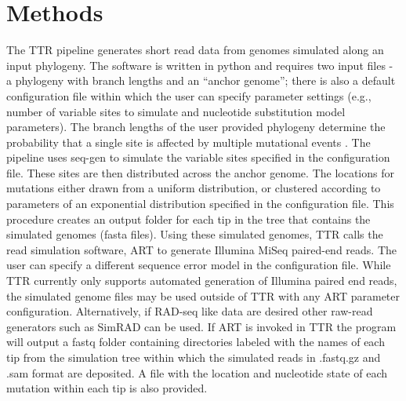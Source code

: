 
\section{Methods}
The TTR pipeline generates short read data from genomes simulated along an input phylogeny. 
The software is written in python and requires two input files - a phylogeny with branch lengths and an “anchor genome”; 
there is also a default configuration file within which the user can specify parameter settings (e.g., number of variable sites to simulate and nucleotide substitution model parameters). 
The branch lengths of the user provided phylogeny determine the probability that a single site is affected by multiple mutational events \citep{sukumaran_dendropy:_2010}.
The pipeline uses seq-gen \citep{rambaut_seq-gen:_1997} to simulate the variable sites specified in the configuration file. 
These sites are then distributed across the anchor genome.
The locations for mutations either drawn from a uniform distribution, 
or clustered according to parameters of an exponential distribution specified in the configuration file. 
This procedure creates an output folder for each tip in the tree that contains the simulated genomes (fasta files). Using these simulated genomes, 
TTR calls the read simulation software, ART \citep{huang_art:_2012} to generate Illumina MiSeq paired-end reads. 
The user can specify a different sequence error model in the configuration file. 
While TTR currently only supports automated generation of Illumina paired end reads, the simulated genome files may be used outside of TTR with any ART parameter configuration. 
Alternatively, if RAD-seq like data are desired other raw-read generators such as SimRAD \citep{lepais_simrad:_2014} can be used. 
If ART is invoked in TTR the program will output a fastq folder containing directories labeled with the names of each tip from the 
simulation tree within which the simulated reads in .fastq.gz and .sam format are deposited. 
A file with the location and nucleotide state of each mutation within each tip is also provided.



